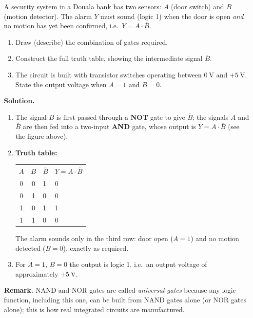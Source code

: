 \documentclass[11pt]{article}
\begin{document}
\begin{exoresolu}
A security system in a Douala bank has two sensors: $A$ (door switch) and $B$ (motion detector). The alarm $Y$ must sound (logic 1) when the door is open \emph{and} no motion has yet been confirmed, i.e.\ $Y = A\cdot\overline{B}$.
\begin{enumerate}
\item Draw (describe) the combination of gates required.
\item Construct the full truth table, showing the intermediate signal $\overline{B}$.
\item The circuit is built with transistor switches operating between $0\ \mathrm{V}$ and $+5\ \mathrm{V}$. State the output voltage when $A = 1$ and $B = 0$.
\end{enumerate}
\tcblower
\textbf{Solution.}
\begin{enumerate}
\item The signal $B$ is first passed through a \textbf{NOT} gate to give $\overline{B}$; the signals $A$ and $\overline{B}$ are then fed into a two-input \textbf{AND} gate, whose output is $Y = A\cdot\overline{B}$ (see the figure above).
\item \textbf{Truth table:}
\begin{center}
\begin{tabularx}{0.7\linewidth}{|c|c|X|X|}
\hline
\rowcolor{popblueL} $A$ & $B$ & $\overline{B}$ & $Y = A\cdot\overline{B}$ \\
\hline
0 & 0 & 1 & 0 \\
\hline
0 & 1 & 0 & 0 \\
\hline
1 & 0 & 1 & 1 \\
\hline
1 & 1 & 0 & 0 \\
\hline
\end{tabularx}
\end{center}
The alarm sounds only in the third row: door open ($A=1$) and no motion detected ($B=0$), exactly as required.
\item For $A = 1$, $B = 0$ the output is logic 1, i.e.\ an output voltage of approximately $+5\ \mathrm{V}$.
\end{enumerate}
\textbf{Remark.} NAND and NOR gates are called \emph{universal gates} because any logic function, including this one, can be built from NAND gates alone (or NOR gates alone); this is how real integrated circuits are manufactured.
\end{exoresolu}
\end{document}
